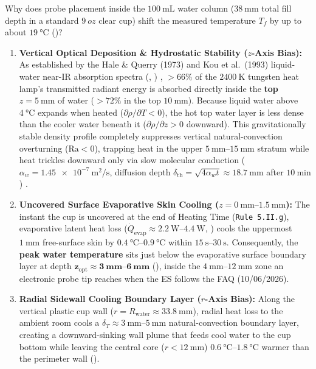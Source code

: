 Why does probe placement inside the $\SI{100}{\milli\liter}$ water column ($\SI{38}{\milli\meter}$ total fill depth in a standard $\SI{9}{oz}$ clear cup) shift the measured temperature $T_f$ by up to about $\SI{19}{\celsius}$ ()?
\begin{enumerate}
  \item \textbf{Vertical Optical Deposition \& Hydrostatic Stability ($z$-Axis Bias):}
  As established by the Hale \& Querry (1973) and Kou et al.\ (1993) liquid-water near-IR absorption spectra (, ) , $>66\%$ of the $\SI{2400}{\kelvin}$ tungsten heat lamp's transmitted radiant energy is absorbed directly inside the \textbf{top $z = \SI{5}{\milli\meter}$} of water ($>72\%$ in the top $\SI{10}{\milli\meter}$). Because liquid water above $\SI{4}{\celsius}$ expands when heated ($\partial\rho/\partial T < 0$), the hot top water layer is less dense than the cooler water beneath it ($\partial\rho/\partial z > 0$ downward). This gravitationally stable density profile completely suppresses vertical natural-convection overturning ($\mathrm{Ra} < 0$), trapping heat in the upper $\SIrange{5}{15}{\milli\meter}$ stratum while heat trickles downward only via slow molecular conduction ($\alpha_w = \SI{1.45e-7}{\square\meter\per\second}$, diffusion depth $\delta_{\mathrm{th}} = \sqrt{4\alpha_w t} \approx \SI{18.7}{\milli\meter}$ after $\SI{10}{\minute}$) .
  \item \textbf{Uncovered Surface Evaporative Skin Cooling ($z = \SIrange{0}{1.5}{\milli\meter}$):}
  The instant the cup is uncovered at the end of Heating Time (\texttt{Rule 5.II.g}), evaporative latent heat loss ($\dot{Q}_{\mathrm{evap}} \approx \SIrange{2.2}{4.4}{\watt}$, ) cools the uppermost $\SI{1}{\milli\meter}$ free-surface skin by $\SIrange{0.4}{0.9}{\celsius}$ within $\SIrange{15}{30}{\second}$. Consequently, the \textbf{peak water temperature} sits just below the evaporative surface boundary layer at depth $\mathbf{z_{\mathrm{opt}} \approx \SIrange{3}{6}{\milli\meter}}$ (), inside the $\SIrange{4}{12}{\milli\meter}$ zone an electronic probe tip reaches when the ES follows the FAQ (10/06/2026).
  \item \textbf{Radial Sidewall Cooling Boundary Layer ($r$-Axis Bias):}
  Along the vertical plastic cup wall ($r = R_{\mathrm{water}} \approx \SI{33.8}{\milli\meter}$), radial heat loss to the ambient room cools a $\delta_T \approx \SIrange{3}{5}{\milli\meter}$ natural-convection boundary layer, creating a downward-sinking wall plume that feeds cool water to the cup bottom while leaving the central core ($r < \SI{12}{\milli\meter}$) $\SIrange{0.6}{1.8}{\celsius}$ warmer than the perimeter wall ().

\end{enumerate}
